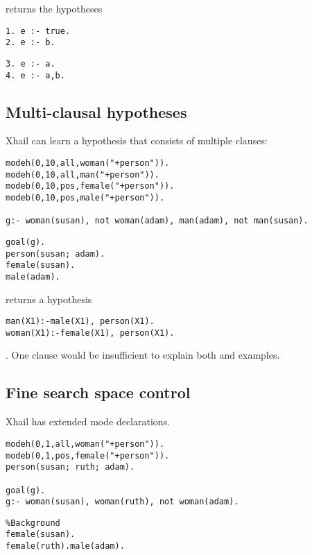 returns the hypotheses

\begin{minipage}[t]{.25\textwidth}
\begin{lstlisting}
1. e :- true.
2. e :- b.
\end{lstlisting}
\end{minipage}
\begin{minipage}[t]{.20\textwidth}
\begin{lstlisting}
3. e :- a.
4. e :- a,b.
\end{lstlisting}
\end{minipage}

\subsection{Multi-clausal hypotheses}
Xhail can learn a hypothesis that consists of multiple clauses:

\begin{minipage}[t]{.50\textwidth}
\begin{lstlisting}
modeh(0,10,all,woman("+person")).
modeh(0,10,all,man("+person")).
modeb(0,10,pos,female("+person")).
modeb(0,10,pos,male("+person")).

g:- woman(susan), not woman(adam), man(adam), not man(susan).
\end{lstlisting}
\end{minipage}
\begin{minipage}[t]{.20\textwidth}
\begin{lstlisting}
goal(g).
person(susan; adam).
female(susan).
male(adam).
\end{lstlisting}
\end{minipage}

returns a hypothesis
\begin{lstlisting}
man(X1):-male(X1), person(X1).
woman(X1):-female(X1), person(X1).
\end{lstlisting}.
One clause would be insufficient to explain both  and  examples.

\subsection{Fine search space control}\label{xhail_fine_search_space_control}
Xhail has extended mode declarations.

\begin{minipage}[t]{.50\textwidth}
\begin{lstlisting}
modeh(0,1,all,woman("+person")).
modeb(0,1,pos,female("+person")).
person(susan; ruth; adam).

goal(g).
g:- woman(susan), woman(ruth), not woman(adam).
\end{lstlisting}
\end{minipage}
\begin{minipage}[t]{.20\textwidth}
\begin{lstlisting}
%Background
female(susan).
female(ruth).male(adam).
\end{lstlisting}
\end{minipage}

